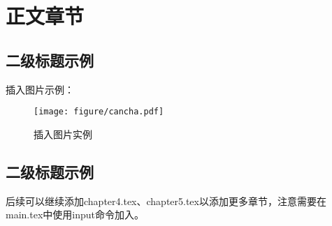 \chapter{正文章节}

\section{二级标题示例}

插入图片示例：
\begin{figure}[H]
    \small
    \centering
    \vspace{22bp}
    \texttt{[image: figure/cancha.pdf]}
    \caption[Caption for LOF]{插入图片实例\protect\footnotemark}
\end{figure}

\section{二级标题示例}

后续可以继续添加chapter4.tex、chapter5.tex以添加更多章节，注意需要在main.tex中使用input命令加入。
